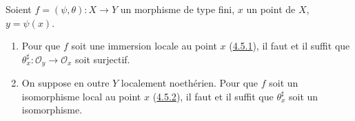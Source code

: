 \begin{proposition}[6.5.4]
\label{I.6.5.4-fr}
Soient $f=(\psi,\theta):X\to Y$ un morphisme de type fini, $x$ un point de
$X$, $y=\psi(x)$.
\begin{enumerate}
  \item[(i)] Pour que $f$ soit une immersion locale au point $x$
    (\hyperref[I.4.5.1-fr]{4.5.1}), il faut et il suffit que
    $\theta_x^\sharp:\mathscr{O}_y\to\mathscr{O}_x$ soit surjectif.
  \item[(ii)] On suppose en outre $Y$ localement noethérien. Pour que $f$ soit
    un isomorphisme local au point $x$
    (\hyperref[I.4.5.2-fr]{4.5.2}), il faut et il suffit que
    $\theta_x^\sharp$ soit un isomorphisme.
\end{enumerate}
\end{proposition}

